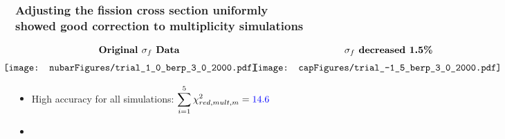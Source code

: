 \begin{frame}
    \frametitle{Adjusting the fission cross section \textbf{uniformly} \\ showed good correction to multiplicity
simulations}
\begin{center}
$\begin{array}{cc} \textbf{Original \sfiss Data} & \hspace{0.13in}\textbf{\sfiss decreased
    1.5\%} \\[6pt]
   \hspace{-0.25in}
\texttt{[image: nubarFigures/trial\_1\_0\_berp\_3\_0\_2000.pdf]} &
\hspace{-0.2in}\texttt{[image: capFigures/trial\_-1\_5\_berp\_3\_0\_2000.pdf]} \\
\end{array}$
\end{center}
\begin{itemize} \vspace{-0.1in} 
  \item High accuracy for all simulations: $\displaystyle \sum_{i=1}^5 \chi^2_{red,mult,m} = {\color{blue} 14.6}$
      \vspace{-0.2in}
  \item {}
\end{itemize} 
\end{frame}






